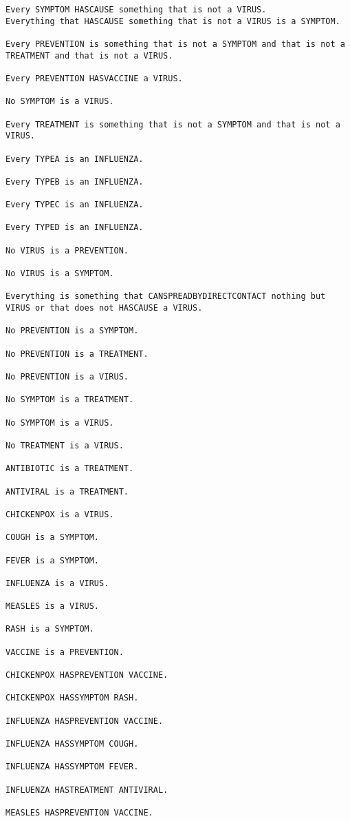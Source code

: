 \documentclass[a4paper,12pt]{report}
\begin{document}
\begin{lstlisting}
Every SYMPTOM HASCAUSE something that is not a VIRUS.
Everything that HASCAUSE something that is not a VIRUS is a SYMPTOM.

Every PREVENTION is something that is not a SYMPTOM and that is not a TREATMENT and that is not a VIRUS.

Every PREVENTION HASVACCINE a VIRUS.

No SYMPTOM is a VIRUS.

Every TREATMENT is something that is not a SYMPTOM and that is not a VIRUS.

Every TYPEA is an INFLUENZA.

Every TYPEB is an INFLUENZA.

Every TYPEC is an INFLUENZA.

Every TYPED is an INFLUENZA.

No VIRUS is a PREVENTION.

No VIRUS is a SYMPTOM.

Everything is something that CANSPREADBYDIRECTCONTACT nothing but VIRUS or that does not HASCAUSE a VIRUS.

No PREVENTION is a SYMPTOM.

No PREVENTION is a TREATMENT.

No PREVENTION is a VIRUS.

No SYMPTOM is a TREATMENT.

No SYMPTOM is a VIRUS.

No TREATMENT is a VIRUS.

ANTIBIOTIC is a TREATMENT.

ANTIVIRAL is a TREATMENT.

CHICKENPOX is a VIRUS.

COUGH is a SYMPTOM.

FEVER is a SYMPTOM.

INFLUENZA is a VIRUS.

MEASLES is a VIRUS.

RASH is a SYMPTOM.

VACCINE is a PREVENTION.

CHICKENPOX HASPREVENTION VACCINE.

CHICKENPOX HASSYMPTOM RASH.

INFLUENZA HASPREVENTION VACCINE.

INFLUENZA HASSYMPTOM COUGH.

INFLUENZA HASSYMPTOM FEVER.

INFLUENZA HASTREATMENT ANTIVIRAL.

MEASLES HASPREVENTION VACCINE.


\end{lstlisting}
\end{document}
